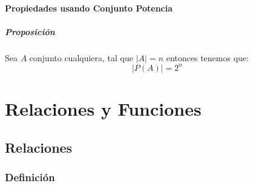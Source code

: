 \documentclass[12pt]{report}                                    %
\begin{document}
            \subsection{Propiedades usando Conjunto Potencia}

                \subsubsection{Proposición}
                    Sea $A$ conjunto cualquiera, tal que $|A| = n$ entonces tenemos que:
                    \begin{equation*}
                        |P(A)| = 2^n
                    \end{equation*}










\part{Relaciones y Funciones}



    \chapter{Relaciones}
        \clearpage

        \section{Definición}
\end{document}
